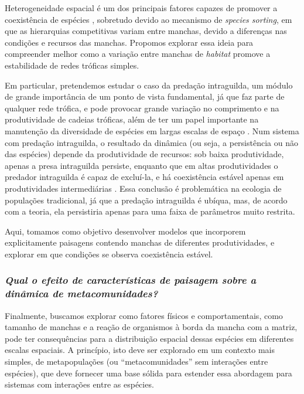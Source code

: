 \documentclass[12pt]{extarticle}
\begin{document}
Heterogeneidade espacial é um dos principais fatores capazes de promover a
coexistência de espécies \citep{amarasekare2003}, sobretudo devido ao
mecanismo de \emph{species sorting}, em que as hierarquias competitivas variam entre manchas, 
devido a diferenças nas condições e recursos das manchas. 
Propomos explorar essa ideia para compreender melhor
como a variação entre manchas de \emph{habitat} promove a estabilidade de
redes tróficas simples.

Em particular, pretendemos estudar o caso da predação intraguilda, um módulo
de grande importância de um ponto de vista fundamental, já que faz parte de
qualquer rede trófica, e pode provocar grande variação no comprimento e na
produtividade de cadeias tróficas, além de ter um papel importante na
manutenção da diversidade de espécies em largas escalas de espaço
\citep{mccann2011}. Num sistema com predação intraguilda, o resultado da
dinâmica (ou seja, a persistência ou não das espécies) depende da
produtividade de recursos: sob baixa produtividade, apenas a presa intraguilda
persiste, enquanto que em altas produtividades o predador intraguilda é capaz
de excluí-la, e há coexistência estável apenas em produtividades
intermediárias \citep{holt1997}. Essa conclusão é problemática na ecologia de
populações tradicional, já que a predação intraguilda é ubíqua, mas, de acordo
com a teoria, ela persistiria apenas para uma faixa de parâmetros muito
restrita.

Aqui, tomamos como objetivo desenvolver modelos que incorporem explicitamente
paisagens contendo manchas de diferentes produtividades, e explorar em que
condições se observa coexistência estável.

\subsubsection*{\em Qual o efeito de características de paisagem sobre a
dinâmica de metacomunidades?}

Finalmente, buscamos explorar como fatores físicos e comportamentais, como
tamanho de manchas e a reação de organismos à borda da mancha com a  matriz, %
pode ter consequências para a distribuição espacial dessas espécies em
diferentes escalas espaciais. A princípio, isto deve ser explorado em um
contexto mais simples, de metapopulações \citep{ovaskainen2004} (ou
``metacomunidades'' sem interações entre espécies), que deve fornecer uma base
sólida para estender essa abordagem para sistemas com interações entre as
espécies. 
\end{document}
